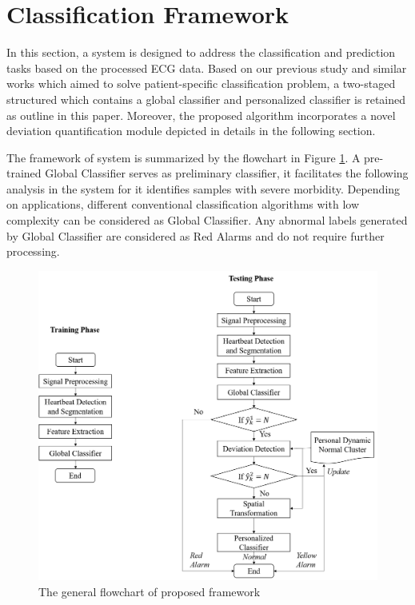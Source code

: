 \section{Classification Framework}


In this section, a system is designed to address the classification and prediction tasks based on the processed ECG data. Based on our previous study and similar works which aimed to solve patient-specific classification problem, a two-staged structured which contains a global classifier and personalized classifier is retained as outline in this paper\cite{chen2018predictive,Hu_et_al,deChazal2006,llamedo2012automatic}. Moreover, the proposed algorithm incorporates a novel deviation quantification module depicted in details in the following section. 

The framework of system is summarized by the flowchart in Figure \ref{fig:flow}. A pre-trained Global Classifier serves as preliminary classifier, it facilitates the following analysis in the system for it identifies samples with severe morbidity. Depending on applications, different conventional classification algorithms with low complexity can be considered as Global Classifier. Any abnormal labels generated by Global Classifier are considered as Red Alarms and do not require further processing.

\begin{figure}[ht]
	\centering
	\includegraphics[scale=.5]{Fig/flow2.png}
	\caption{The general flowchart of proposed framework}
	\label{fig:flow}
\end{figure}

